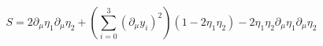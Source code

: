 \begin{equation}
S=2\partial_\mu\eta_1\partial_\mu\eta_2
+
\left(\sum_{i=0}^3
  \left(\partial_\mu y_i\right)^2\right)
  (1-2\eta_1\eta_2)-2\eta_1\eta_2\partial_\mu\eta_1\partial_\mu\eta_2
\end{equation}

